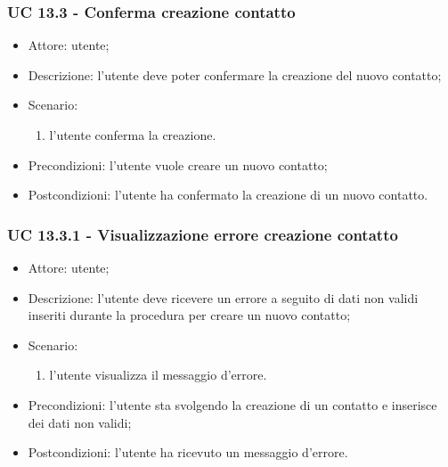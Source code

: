 \subsubsection{UC 13.3 - Conferma creazione contatto} \label{sec: UC 13.3}
\begin{itemize}
    \item Attore: utente;
    \item Descrizione: l'utente deve poter confermare la creazione del nuovo contatto;
    \item Scenario:
        \begin{enumerate}
        \item l'utente conferma la creazione.
        \end{enumerate}
    
    \item Precondizioni: l'utente vuole creare un nuovo contatto;
    \item Postcondizioni: l'utente ha confermato la creazione di un nuovo contatto.
\end{itemize}


\subsubsection{UC 13.3.1 - Visualizzazione errore creazione contatto} \label{sec: UC 13.3.1}
\begin{itemize}
    \item Attore: utente;
    \item Descrizione: l'utente deve ricevere un errore a seguito di dati non validi inseriti durante la procedura per creare un nuovo contatto;
    \item Scenario:
        \begin{enumerate}
        \item l'utente visualizza il messaggio d'errore.
        \end{enumerate}
    
    \item Precondizioni: l'utente sta svolgendo la creazione di un contatto e inserisce dei dati non validi;
    \item Postcondizioni: l'utente ha ricevuto un messaggio d'errore.
\end{itemize}


